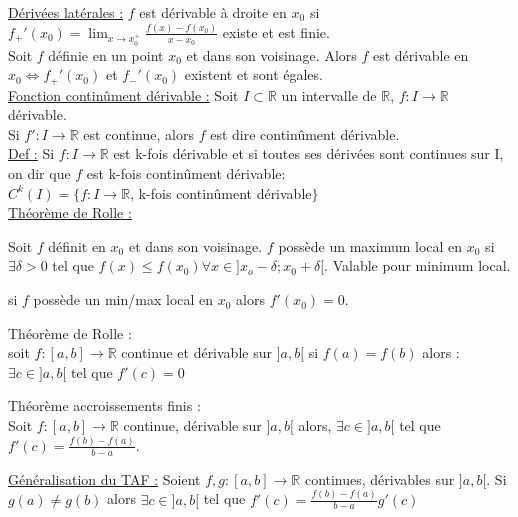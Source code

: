 \documentclass[../main.tex]{subfiles}
\begin{document}
\quad \underline{Dérivées latérales :}
$f$ est dérivable à droite en $x_0$ si $f_+'(x_0) = \lim_{x\rightarrow x_0^+} \frac{f(x) - f(x_0)}{x-x_0}$ existe et est finie. \\

Soit $f$ définie en un point $x_0$ et dans son voisinage. Alors $f$ est dérivable en $x_0 \Leftrightarrow f_+'(x_0)$ et $f_-'(x_0)$ existent et sont égales.\\

\quad \underline{Fonction continûment dérivable :} Soit $I \subset \mathbb{R}$ un intervalle de $\mathbb{R}$, $f:I\rightarrow \mathbb{R}$ dérivable.\\
Si $f' : I\rightarrow \mathbb{R}$ est continue, alors $f$ est dire continûment dérivable. \\

\underline{Def :} Si $f: I\rightarrow \mathbb{R}$ est k-fois dérivable et si toutes ses dérivées sont continues sur I, on dir que $f$ est k-fois continûment dérivable: \\
$C^k(I) = \{f:I\rightarrow \mathbb{R}$, k-fois continûment dérivable$\}$\\

\quad \underline{Théorème de Rolle :}

Soit $f$ définit en $x_0$ et dans son voisinage. $f$ possède un maximum local en $x_0$ si $\exists \delta > 0$ tel que $f(x) \leq f(x_0) \forall x \in ]x_o-\delta; x_0+\delta[$. Valable pour minimum local.\\

\begin{theorem}
    si $f$ possède un min/max local en $x_0$ alors $f'(x_0) = 0$.
\end{theorem}

\begin{theorem}Théorème de Rolle :\\soit $f:[a,b] \rightarrow \mathbb{R}$ continue et dérivable sur $]a,b[$ si $f(a) = f(b)$ alors : $\exists c \in ]a,b[$ tel que $f'(c)  = 0$
\end{theorem}

\begin{theorem}Théorème accroissements finis :\\ Soit $f:[a,b] \rightarrow \mathbb{R}$ continue, dérivable sur $]a,b[$ alors, $\exists c \in ]a,b[$ tel que $f'(c) = \frac{f(b)-f(a)}{b-a}$.
\end{theorem}

\underline{Généralisation du TAF :} Soient $f,g:[a,b] \rightarrow \mathbb{R}$ continues, dérivables sur $]a,b[$. Si $g(a) \neq g(b)$ alors $\exists c \in ]a,b[$ tel que $f'(c) = \frac{f(b)-f(a)}{b-a} g'(c)$\\
\end{document}

